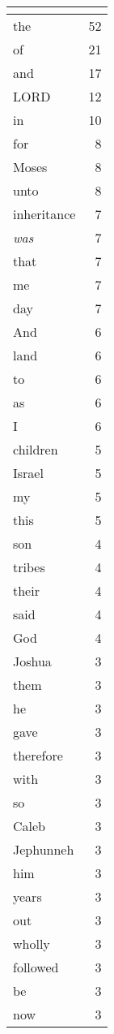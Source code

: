 \begin{center}
\begin{longtable}{l|r}
\hline \multicolumn{2}{c}{{ }} \\ \hline
\endfoot 
the & 52\\ \hline 
of & 21\\ \hline 
and & 17\\ \hline 
LORD & 12\\ \hline 
in & 10\\ \hline 
for & 8\\ \hline 
Moses & 8\\ \hline 
unto & 8\\ \hline 
inheritance & 7\\ \hline 
\emph{was} & 7\\ \hline 
that & 7\\ \hline 
me & 7\\ \hline 
day & 7\\ \hline 
And & 6\\ \hline 
land & 6\\ \hline 
to & 6\\ \hline 
as & 6\\ \hline 
I & 6\\ \hline 
children & 5\\ \hline 
Israel & 5\\ \hline 
my & 5\\ \hline 
this & 5\\ \hline 
son & 4\\ \hline 
tribes & 4\\ \hline 
their & 4\\ \hline 
said & 4\\ \hline 
God & 4\\ \hline 
Joshua & 3\\ \hline 
them & 3\\ \hline 
he & 3\\ \hline 
gave & 3\\ \hline 
therefore & 3\\ \hline 
with & 3\\ \hline 
so & 3\\ \hline 
Caleb & 3\\ \hline 
Jephunneh & 3\\ \hline 
him & 3\\ \hline 
years & 3\\ \hline 
out & 3\\ \hline 
wholly & 3\\ \hline 
followed & 3\\ \hline 
be & 3\\ \hline 
now & 3\\ \hline 

\end{longtable}
\end{center}
